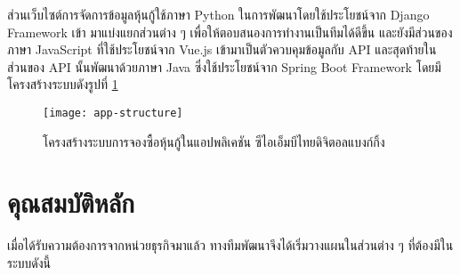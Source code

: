 ส่วนเว็บไซต์การจัดการข้อมูลหุ้นกู้ใช้ภาษา Python ในการพัฒนาโดยใช้ประโยชน์จาก Django Framework เข้า
มาแบ่งแยกส่วนต่าง ๆ เพื่อให้ตอบสนองการทำงานเป็นทีมได้ดีขึ้น และยังมีส่วนของภาษา JavaScript ที่ใช้ประโยชน์จาก Vue.js
เข้ามาเป็นตัวควบคุมข้อมูลกับ API และสุดท้ายในส่วนของ API นั้นพัฒนาด้วยภาษา Java ซึ่งใช้ประโยชน์จาก Spring Boot Framework
โดยมีโครงสร้างระบบดังรูปที่ \ref{app-structure}
\begin{figure}[H]
    \centering
    \texttt{[image: app-structure]}
    \caption{โครงสร้างระบบการจองซื้อหุ้นกู้ในแอปพลิเคชัน ซีไอเอ็มบีไทยดิจิตอลแบงก์กิ้ง}\label{app-structure}
\end{figure}


\section{คุณสมบัติหลัก}
เมื่อได้รับความต้องการจากหน่วยธุรกิจมาแล้ว ทางทีมพัฒนาจึงได้เริ่มวางแผนในส่วนต่าง ๆ ที่ต้องมีในระบบดังนี้
